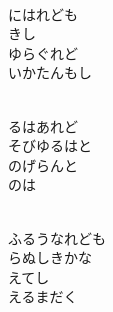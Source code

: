 \documentclass[10pt,b5j]{tarticle} %
\begin{document}
\vspace{1.5em} %
\newcommand{\linespace}{0.5em} %
\newcommand{\blocksize}{0.5\hsize} %
\newcommand{\itemmargin}{3em} %
\begin{enumerate} %
    \setlength{\itemindent}{\itemmargin} %
    \begin{minipage}[c]{\blocksize}
    
        \vspace{\linespace}
        \item~\\
        にはれども\\
        きし\\
        ゆらぐれど\\
        いかたんもし
        
    \end{minipage}
    \begin{minipage}[c]{\blocksize}
        
        \vspace{\linespace}
        \item~\\
        るはあれど\\
        そびゆるはと\\
        のげらんと\\
        のは
        
    \end{minipage}
    \begin{minipage}[c]{\blocksize}
        
        \vspace{\linespace}
        \item~\\
        ふるうなれども\\
        らぬしきかな\\
        えてし\\
        えるまだく
        
    \end{minipage}
    \begin{minipage}[c]{\blocksize}
        

\end{minipage}
\end{enumerate}
\end{document}
